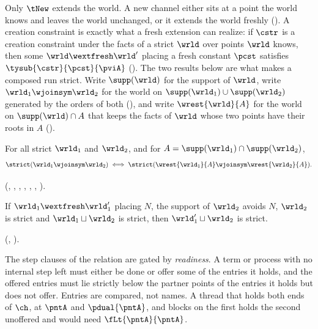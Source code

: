 Only $\tNew$ extends the world. A new channel either sits at a point the
world knows and leaves the world unchanged, or it extends the world
freshly (). A creation
constraint is exactly what a fresh extension can realize: if $\cstr$ is a
creation constraint under the facts of a strict $\wrld$ over points
$\wrld$ knows, then some $\wrld \wextfresh \wrld'$ placing a fresh
constant $\pcst$ satisfies $\tysub{\cstr}{\pcst}{\pviA}$
(). The two
results below are what makes a composed run strict. Write
$\supp(\wrld)$ for the support of $\wrld$, write
$\wrld_1 \wjoinsym \wrld_2$ for the world on
$\supp(\wrld_1) \cup \supp(\wrld_2)$ generated by the orders of both
(), and write $\wrest{\wrld}{A}$ for the world on
$\supp(\wrld) \cap A$ that keeps the facts of $\wrld$ whose two points
have their roots in $A$ ().

\begin{theorem}
\label{thm:amalgamation}
  For all strict $\wrld_1$ and $\wrld_2$, and for
  $A = \supp(\wrld_1) \cap \supp(\wrld_2)$,
  \[
    \strict(\wrld_1 \wjoinsym \wrld_2)
    \iff
    \strict(\wrest{\wrld_1}{A} \wjoinsym \wrest{\wrld_2}{A}) .
  \]
\end{theorem}

(, , , ,
, , ).

\begin{theorem}
\label{thm:fresh-extension}
  If $\wrld_1 \wextfresh \wrld_1'$ placing $N$, the support of
  $\wrld_2$ avoids $N$, $\wrld_2$ is strict and
  $\wrld_1 \sqcup \wrld_2$ is strict, then
  $\wrld_1' \sqcup \wrld_2$ is strict.
\end{theorem}

(, ).

The step clauses of the relation are gated by \emph{readiness}. A term
or process with no internal step left must either be done or offer some
of the entries it holds, and the offered entries must lie strictly below
the partner points of the entries it holds but does not offer. Entries
are compared, not names. A thread that holds both ends of $\ch$, at
$\pntA$ and $\pdual{\pntA}$, and blocks on the first holds the second
unoffered and would need $\fLt{\pntA}{\pntA}$.

